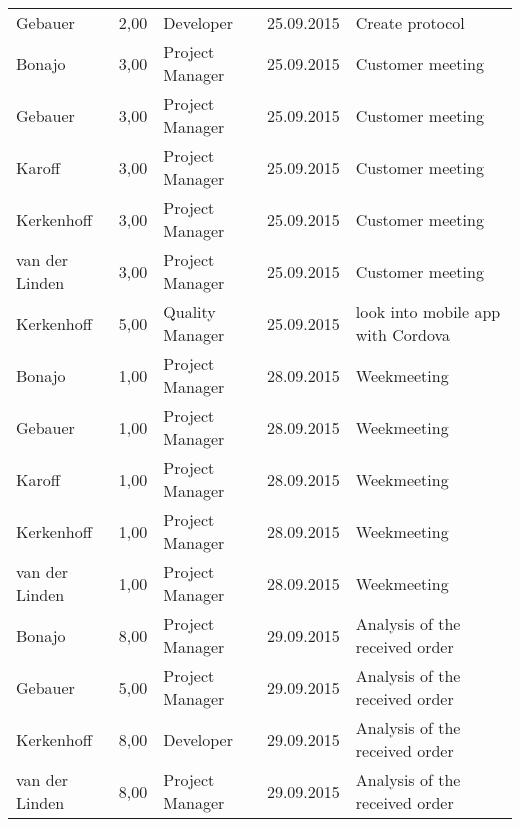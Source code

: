 \begin{longtable}{ l r p{2cm} c p{4cm} }
		Gebauer                 & 2,00           & Developer       & 25.09.2015    & Create protocol                              \\
		Bonajo                  & 3,00           & Project Manager & 25.09.2015    & Customer meeting                              \\
		Gebauer                 & 3,00           & Project Manager & 25.09.2015    & Customer meeting                              \\
		Karoff                  & 3,00           & Project Manager & 25.09.2015    & Customer meeting                              \\
		Kerkenhoff              & 3,00           & Project Manager & 25.09.2015    & Customer meeting                              \\
		van der Linden          & 3,00           & Project Manager & 25.09.2015    & Customer meeting                              \\
		Kerkenhoff              & 5,00           & Quality Manager & 25.09.2015    & look into mobile app with Cordova            \\
		Bonajo                  & 1,00           & Project Manager & 28.09.2015    & Weekmeeting                                  \\
		Gebauer                 & 1,00           & Project Manager & 28.09.2015    & Weekmeeting                                  \\
		Karoff                  & 1,00           & Project Manager & 28.09.2015    & Weekmeeting                                  \\
		Kerkenhoff              & 1,00           & Project Manager & 28.09.2015    & Weekmeeting                                  \\
		van der Linden          & 1,00           & Project Manager & 28.09.2015    & Weekmeeting                                  \\
		Bonajo                  & 8,00           & Project Manager & 29.09.2015    & Analysis of the received order               \\
		Gebauer                 & 5,00           & Project Manager & 29.09.2015    & Analysis of the received order               \\
		Kerkenhoff              & 8,00           & Developer       & 29.09.2015    & Analysis of the received order               \\
		van der Linden          & 8,00           & Project Manager & 29.09.2015    & Analysis of the received order               \\

\end{longtable}
